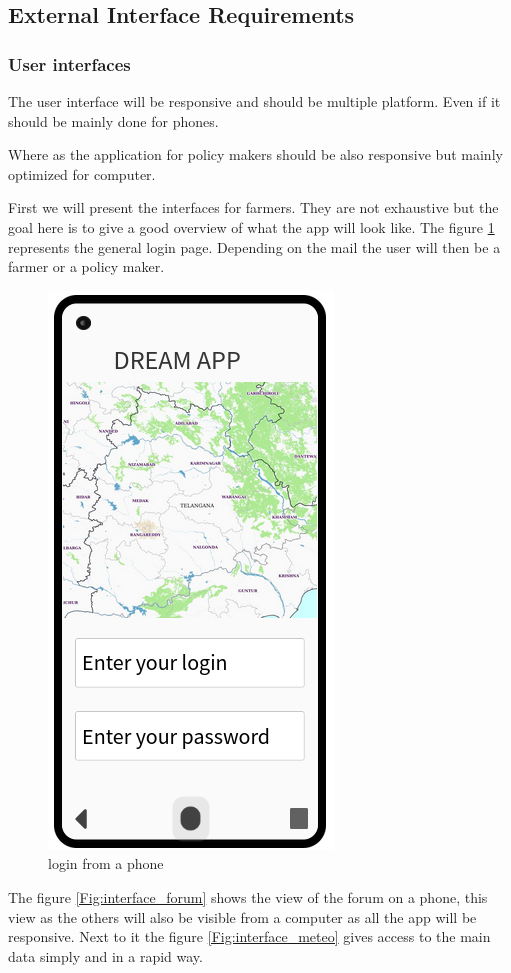 \subsection{External Interface Requirements}
\subsubsection{User interfaces}
The user interface will be responsive and should be multiple platform. Even if it should be mainly done for phones. \newline

Where as the application for policy makers should be also responsive but mainly optimized for computer.



First we will present the interfaces for farmers. They are not exhaustive but the goal here is to give a good overview of what the app will look like. The figure \ref{Fig:interface_login} represents the general login page. Depending on the mail the user will then be a farmer or a policy maker.

\begin{figure}[H]

	\centering

	\includegraphics[width=0.3\columnwidth]{Images/login.png}

	\caption{login from a phone}

	\label{Fig:interface_login}

\end{figure}



The figure \ref{Fig:interface_forum} shows the view of the forum on a phone, this view as the others will also be visible from a computer as all the app will be responsive. Next to it the figure \ref{Fig:interface_meteo} gives access to the main data simply and in a rapid way.

